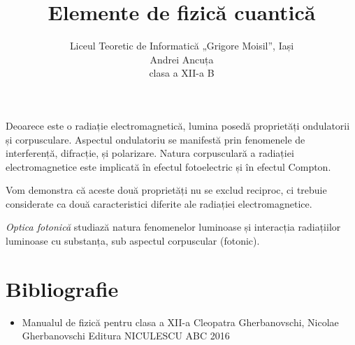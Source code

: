 \documentclass[a4paper, 12pt]{article}
\title{Elemente de fizică cuantică}
\author{Liceul Teoretic de Informatică „Grigore Moisil”, Iași \\ Andrei Ancuța \\
clasa a XII-a B}
\def\\{}%
\newcommand{\mktitle}{%
    \noindent
    {\small\theauthor}

    \begin{center}
        \LARGE\thetitle
    \end{center}
}
\newcommand{\parbreak}{\vspace{1cm}}
\begin{document}
\mktitle
\tableofcontents

\parbreak

Deoarece este o radiație electromagnetică, lumina posedă proprietăți
ondulatorii și corpusculare. Aspectul ondulatoriu se manifestă prin
fenomenele de interferență, difracție, și polarizare. Natura corpusculară
a radiației electromagnetice este implicată în efectul fotoelectric și în
efectul Compton.

Vom demonstra că aceste două proprietăți nu se exclud reciproc, ci
trebuie considerate ca două caracteristici diferite ale radiației
electromagnetice.

\emph{Optica fotonică} studiază natura fenomenelor luminoase și interacția
radiațiilor luminoase cu substanța, sub aspectul corpuscular (fotonic).




\clearpage

\section*{Bibliografie}
\begin{itemize}
    \item Manualul de fizică pentru clasa a XII-a \\
        Cleopatra Gherbanovschi, Nicolae Gherbanovschi \\
        Editura NICULESCU ABC \\
        2016
\end{itemize}
\end{document}

